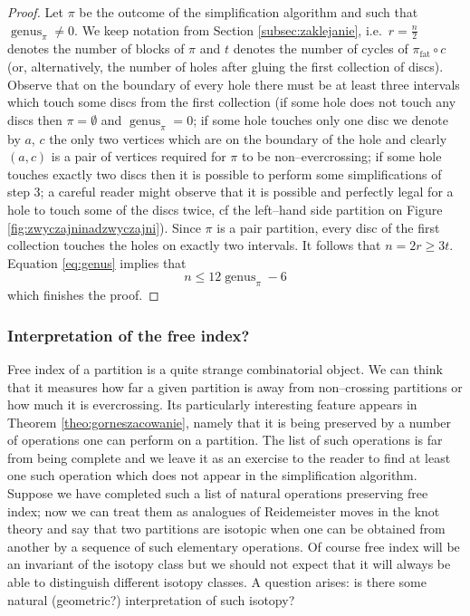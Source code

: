 \documentclass[12pt,dvips]{amsart}
\numberwithin{equation}{section} \numberwithin{figure}{section}
\theoremstyle{plain}
\theoremstyle{definition}
\theoremstyle{remark}
\DeclareMathOperator{\fat}{fat}
\DeclareMathOperator{\genus}{genus}
\begin{document}
\begin{proof}
Let $\pi$ be the outcome of the simplification algorithm and such
that $\genus_{\pi}\neq 0$. We keep notation from Section
\ref{subsec:zaklejanie}, i.e.~$r=\frac{n}{2}$ denotes the number of
blocks of $\pi$ and $t$ denotes the number of cycles of
$\pi_{\fat}\circ c$ (or, alternatively, the number of holes after
gluing the first collection of discs). Observe that on the boundary
of every hole there must be at least three intervals which touch
some discs from the first collection (if some hole does not touch
any discs then $\pi=\emptyset$ and $\genus_{\pi}=0$; if some hole
touches only one disc we denote by $a$, $c$ the only two vertices
which are on the boundary of the hole and clearly $(a,c)$ is a pair
of vertices required for $\pi$ to be non--evercrossing; if some hole
touches exactly two discs then it is possible to perform some
simplifications of step 3; a careful reader might observe that it is
possible and perfectly legal for a hole to touch some of the discs
twice, cf the left--hand side partition on Figure
\ref{fig:zwyczajninadzwyczajni}). Since $\pi$ is a pair partition,
every disc of the first collection touches the holes on exactly two
intervals. It follows that $n= 2r \geq 3t $. Equation
\eqref{eq:genus} implies that
$$ n \leq 12 \genus_{\pi}-6$$
which finishes the proof.
\end{proof}

\subsubsection{Interpretation of the free index?} Free index of a
partition is a quite strange combinatorial object. We can think that
it measures how far a given partition is away from non--crossing
partitions or how much it is evercrossing. Its particularly
interesting feature appears in Theorem \ref{theo:gorneszacowanie},
namely that it is being preserved by a number of operations one can
perform on a partition. The list of such operations is far from
being complete and we leave it as an exercise to the reader to find
at least one such operation which does not appear in the
simplification algorithm. Suppose we have completed such a list of
natural operations preserving free index; now we can treat them as
analogues of Reidemeister moves in the knot theory and say that two
partitions are isotopic when one can be obtained from another by a
sequence of such elementary operations. Of course free index will be
an invariant of the isotopy class but we should not expect that it
will always be able to distinguish different isotopy classes. A
question arises: is there some natural (geometric?) interpretation
of such isotopy?
\end{document}
